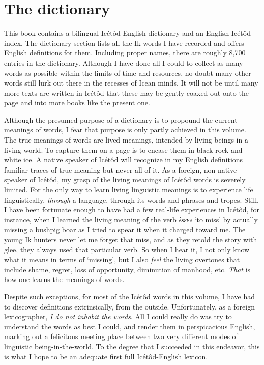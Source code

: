  
\section{The dictionary} 

This book contains a bilingual Icétôd-English dictionary and an English-Icétôd index. The dictionary section lists all the Ik words I have recorded and offers English definitions for them. Including proper names, there are roughly 8,700 entries in the dictionary. Although I have done all I could to collect as many words as possible within the limits of time and resources, no doubt many other words still lurk out there in the recesses of Icean minds. It will not be until many more texts are written in Icétôd that these may be gently coaxed out onto the page and into more books like the present one. 

Although the presumed purpose of a dictionary is to propound the current meanings of words, I fear that purpose is only partly achieved in this volume. The true meanings of words are lived meanings, intended by living beings in a living world. To capture them on a page is to encase them in black rock and white ice. A native speaker of Icétôd will recognize in my English definitions familiar traces of true meaning but never all of it. As a foreign, non-native speaker of Icétôd, my grasp of the living meanings of Icétôd words is severely limited. For the only way to learn living linguistic meanings is to experience life linguistically, \textit{through} a language, through its words and phrases and tropes. Still, I have been fortunate enough to have had a few real-life experiences in Icétôd, for instance, when I learned the living meaning of the verb \textit{ɨsɛɛs }‘to miss’ by actually missing a bushpig boar as I tried to spear it when it charged toward me. The young Ik hunters never let me forget that miss, and as they retold the story with glee, they always used that particular verb. So when I hear it, I not only know what it means in terms of ‘missing’, but I also \textit{feel} the living overtones that include shame, regret, loss of opportunity, diminution of manhood, etc. \textit{That} is how one learns the meanings of words. 

Despite such exceptions, for most of the Icétôd words in this volume, I have had to discover definitions extrinsically, from the outside. Unfortunately, as a foreign lexicographer, \textit{I do not inhabit the words}. All I could really do was try to understand the words as best I could, and render them in perspicacious English, marking out a felicitous meeting place between two very different modes of linguistic being-in-the-world. To the degree that I succeeded in this endeavor, this is what I hope to be an adequate first full Icétôd-English lexicon.

